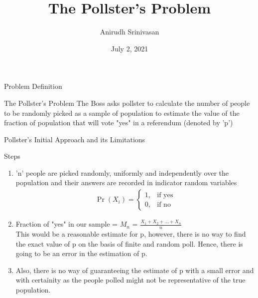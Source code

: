 \documentclass{beamer}
\title{The Pollster's Problem}
\author{Anirudh Srinivasan}
\institute{IIT Hyderabad}
\date{July 2, 2021}
\providecommand{\pr}[1]{\ensuremath{\Pr\left(#1\right)}}
\begin{document}
\begin{frame}
\titlepage
\end{frame}
\begin{frame}{Problem Definition}
\begin{block}{The Pollster's Problem}
The Boss asks pollster to calculate the number of people to be randomly picked as a sample of population to estimate the value of the fraction of population that will vote "yes" in a referendum (denoted by 'p')
\end{block}
\end{frame}

\begin{frame}{Pollster's Initial Approach and its Limitations}
\begin{block}{Steps}
\begin{enumerate}
    \item 'n' people are picked randomly, uniformly and independently over the population and their answers are recorded in indicator random variables 
    \begin{align}
    \pr{X_i} =\begin{cases}
     1, &\text{if yes}  \\
     0, &\text{if no} 
                \end{cases}
    \end{align}
    \item Fraction of "yes" in our sample = $M_n$ = $\frac{X_1+X_2+\dots+X_n}{n}$\\This would be a reasonable estimate for p, however, there is no way to find the exact value of p on the basis of finite and random poll. Hence, there is going to be an error in the estimation of p.
    \item Also, there is no way of guaranteeing the estimate of p with a small error and with certainity as the people polled might not be representative of the true population.
\end{enumerate}
\end{block}
\end{frame}
\end{document}
